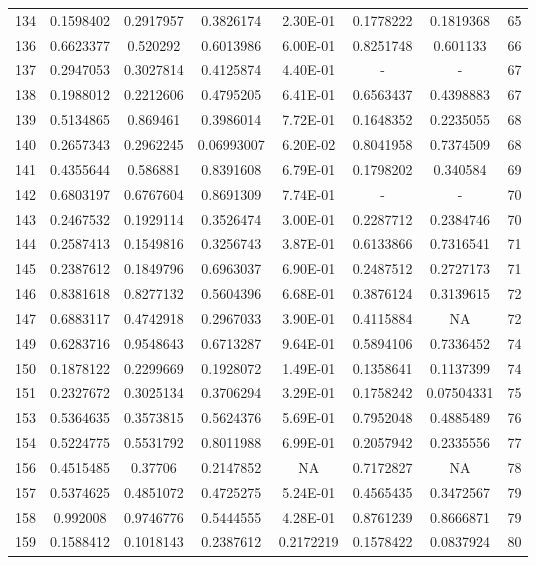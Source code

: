 \begin{anexosenv}
{\begin{longtable}{cccccccc}
134 & 0.1598402 & 0.2917957 & 0.3826174 & 2.30E-01 & 0.1778222 & 0.1819368 & 65 \\ 
136 & 0.6623377 & 0.520292 & 0.6013986 & 6.00E-01 & 0.8251748 & 0.601133 & 66 \\ 
137 & 0.2947053 & 0.3027814 & 0.4125874 & 4.40E-01 & - & - &  67 \\ 
138 & 0.1988012 & 0.2212606 & 0.4795205 & 6.41E-01 & 0.6563437 & 0.4398883 & 67 \\ 
139 & 0.5134865 & 0.869461 & 0.3986014 & 7.72E-01 & 0.1648352 & 0.2235055 & 68 \\ 
140 & 0.2657343 & 0.2962245 & 0.06993007 & 6.20E-02 & 0.8041958 & 0.7374509 & 68 \\ 
141 & 0.4355644 & 0.586881 & 0.8391608 & 6.79E-01 & 0.1798202 & 0.340584 & 69 \\ 
142 & 0.6803197 & 0.6767604 & 0.8691309 & 7.74E-01 & - & - &  70 \\ 
143 & 0.2467532 & 0.1929114 & 0.3526474 & 3.00E-01 & 0.2287712 & 0.2384746 & 70 \\ 
144 & 0.2587413 & 0.1549816 & 0.3256743 & 3.87E-01 & 0.6133866 & 0.7316541 & 71 \\ 
145 & 0.2387612 & 0.1849796 & 0.6963037 & 6.90E-01 & 0.2487512 & 0.2727173 & 71 \\ 
146 & 0.8381618 & 0.8277132 & 0.5604396 & 6.68E-01 & 0.3876124 & 0.3139615 & 72 \\ 
147 & 0.6883117 & 0.4742918 & 0.2967033 & 3.90E-01 & 0.4115884 & NA & 72 \\ 
149 & 0.6283716 & 0.9548643 & 0.6713287 & 9.64E-01 & 0.5894106 & 0.7336452 & 74 \\ 
150 & 0.1878122 & 0.2299669 & 0.1928072 & 1.49E-01 & 0.1358641 & 0.1137399 & 74 \\ 
151 & 0.2327672 & 0.3025134 & 0.3706294 & 3.29E-01 & 0.1758242 & 0.07504331 & 75 \\ 
153 & 0.5364635 & 0.3573815 & 0.5624376 & 5.69E-01 & 0.7952048 & 0.4885489 & 76 \\ 
154 & 0.5224775 & 0.5531792 & 0.8011988 & 6.99E-01 & 0.2057942 & 0.2335556 & 77 \\ 
156 & 0.4515485 & 0.37706 & 0.2147852 & NA & 0.7172827 & NA & 78 \\ 
157 & 0.5374625 & 0.4851072 & 0.4725275 & 5.24E-01 & 0.4565435 & 0.3472567 & 79 \\ 
158 & 0.992008 & 0.9746776 & 0.5444555 & 4.28E-01 & 0.8761239 & 0.8666871 & 79 \\ 
159 & 0.1588412 & 0.1018143 & 0.2387612 & 0.2172219 & 0.1578422 & 0.0837924 & 80 \\ 

\end{longtable}}
\end{anexosenv}
